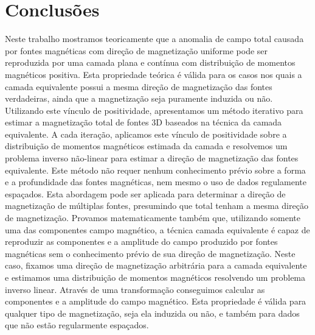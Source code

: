 \chapter{Conclusões}
\label{chap:conclusion}

Neste trabalho mostramos teoricamente que a anomalia de campo total causada por fontes magnéticas com direção de magnetização uniforme pode ser reproduzida por uma camada plana e contínua com distribuição de momentos magnéticos positiva. Esta propriedade teórica é válida para os casos nos quais a camada equivalente possui a mesma direção de magnetização das fontes verdadeiras, ainda que a magnetização seja puramente induzida ou não. Utilizando este vínculo de positividade, apresentamos um método iterativo para estimar a magnetização total de fontes 3D baseados na técnica da camada equivalente. A cada iteração, aplicamos este vínculo de positividade sobre a distribuição de momentos magnéticos estimada da camada e resolvemos um problema inverso não-linear para estimar a direção de magnetização das fontes equivalente. Este método não requer nenhum conhecimento prévio sobre a forma e a profundidade das fontes magnéticas, nem mesmo o uso de dados regulamente espaçados. Esta abordagem pode ser aplicada para determinar a direção de magnetização de múltiplas fontes, presumindo que total tenham a mesma direção de magnetização. Provamos matematicamente também que, utilizando somente uma das componentes campo magnético, a técnica camada equivalente é capaz de reproduzir as componentes e a amplitude do campo produzido por fontes magnéticas sem o conhecimento prévio de sua direção de magnetização. Neste caso, fixamos uma direção de magnetização arbitrária para a camada equivalente e estimamos uma distribuição de momentos magnéticos resolvendo um problema inverso linear. Através de uma transformação conseguimos calcular as componentes e a amplitude do campo magnético. Esta propriedade é válida para qualquer tipo de magnetização, seja ela induzida ou não, e também para dados que não estão regularmente espaçados. 

